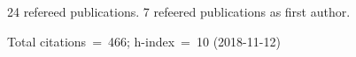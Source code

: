24 refereed publications. 7 refeered publications as first author.

Total citations~=~466; h-index~=~10 (2018-11-12)